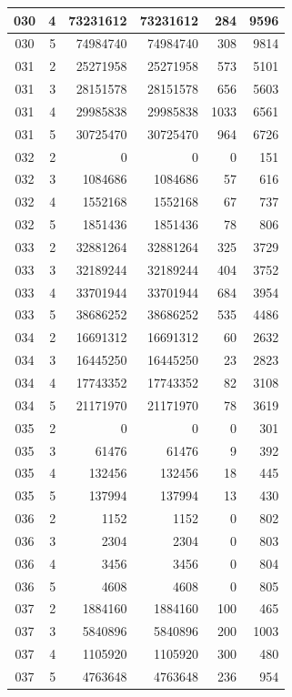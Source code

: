 \begin{longtable}{|c|r|r|r|r|r|}
\hline
030 & 4 & 73231612 & 73231612 & 284 & 9596 \\
\hline
030 & 5 & 74984740 & 74984740 & 308 & 9814 \\
\hline
031 & 2 & 25271958 & 25271958 & 573 & 5101 \\
\hline
031 & 3 & 28151578 & 28151578 & 656 & 5603 \\
\hline
031 & 4 & 29985838 & 29985838 & 1033 & 6561 \\
\hline
031 & 5 & 30725470 & 30725470 & 964 & 6726 \\
\hline
032 & 2 & 0 & 0 & 0 & 151 \\
\hline
032 & 3 & 1084686 & 1084686 & 57 & 616 \\
\hline
032 & 4 & 1552168 & 1552168 & 67 & 737 \\
\hline
032 & 5 & 1851436 & 1851436 & 78 & 806 \\
\hline
033 & 2 & 32881264 & 32881264 & 325 & 3729 \\
\hline
033 & 3 & 32189244 & 32189244 & 404 & 3752 \\
\hline
033 & 4 & 33701944 & 33701944 & 684 & 3954 \\
\hline
033 & 5 & 38686252 & 38686252 & 535 & 4486 \\
\hline
034 & 2 & 16691312 & 16691312 & 60 & 2632 \\
\hline
034 & 3 & 16445250 & 16445250 & 23 & 2823 \\
\hline
034 & 4 & 17743352 & 17743352 & 82 & 3108 \\
\hline
034 & 5 & 21171970 & 21171970 & 78 & 3619 \\
\hline
035 & 2 & 0 & 0 & 0 & 301 \\
\hline
035 & 3 & 61476 & 61476 & 9 & 392 \\
\hline
035 & 4 & 132456 & 132456 & 18 & 445 \\
\hline
035 & 5 & 137994 & 137994 & 13 & 430 \\
\hline
036 & 2 & 1152 & 1152 & 0 & 802 \\
\hline
036 & 3 & 2304 & 2304 & 0 & 803 \\
\hline
036 & 4 & 3456 & 3456 & 0 & 804 \\
\hline
036 & 5 & 4608 & 4608 & 0 & 805 \\
\hline
037 & 2 & 1884160 & 1884160 & 100 & 465 \\
\hline
037 & 3 & 5840896 & 5840896 & 200 & 1003 \\
\hline
037 & 4 & 1105920 & 1105920 & 300 & 480 \\
\hline
037 & 5 & 4763648 & 4763648 & 236 & 954 \\

\end{longtable}
